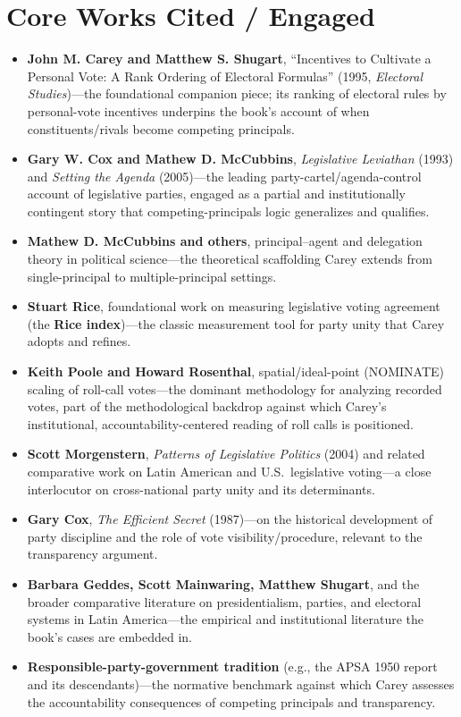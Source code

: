 \documentclass[12pt]{article}
\begin{document}
\section{Core Works Cited / Engaged}

\begin{itemize}[leftmargin=*, itemsep=4pt]
    \item \textbf{John M. Carey and Matthew S. Shugart}, ``Incentives to Cultivate a Personal Vote: A Rank Ordering of Electoral Formulas'' (1995, \textit{Electoral Studies})---the foundational companion piece; its ranking of electoral rules by personal-vote incentives underpins the book's account of when constituents/rivals become competing principals.
    \item \textbf{Gary W. Cox and Mathew D. McCubbins}, \textit{Legislative Leviathan} (1993) and \textit{Setting the Agenda} (2005)---the leading party-cartel/agenda-control account of legislative parties, engaged as a partial and institutionally contingent story that competing-principals logic generalizes and qualifies.
    \item \textbf{Mathew D. McCubbins and others}, principal--agent and delegation theory in political science---the theoretical scaffolding Carey extends from single-principal to multiple-principal settings.
    \item \textbf{Stuart Rice}, foundational work on measuring legislative voting agreement (the \textbf{Rice index})---the classic measurement tool for party unity that Carey adopts and refines.
    \item \textbf{Keith Poole and Howard Rosenthal}, spatial/ideal-point (NOMINATE) scaling of roll-call votes---the dominant methodology for analyzing recorded votes, part of the methodological backdrop against which Carey's institutional, accountability-centered reading of roll calls is positioned.
    \item \textbf{Scott Morgenstern}, \textit{Patterns of Legislative Politics} (2004) and related comparative work on Latin American and U.S.\ legislative voting---a close interlocutor on cross-national party unity and its determinants.
    \item \textbf{Gary Cox}, \textit{The Efficient Secret} (1987)---on the historical development of party discipline and the role of vote visibility/procedure, relevant to the transparency argument.
    \item \textbf{Barbara Geddes, Scott Mainwaring, Matthew Shugart}, and the broader comparative literature on presidentialism, parties, and electoral systems in Latin America---the empirical and institutional literature the book's cases are embedded in.
    \item \textbf{Responsible-party-government tradition} (e.g., the APSA 1950 report and its descendants)---the normative benchmark against which Carey assesses the accountability consequences of competing principals and transparency.
\end{itemize}
\end{document}
